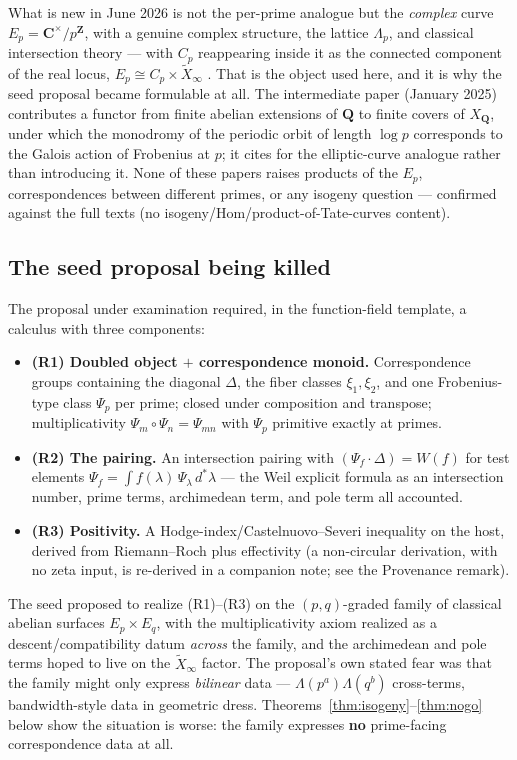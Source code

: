 \documentclass[11pt]{article}
\theoremstyle{definition}
\theoremstyle{remark}
\newcommand{\Z}{\mathbf{Z}}
\newcommand{\Q}{\mathbf{Q}}
\newcommand{\C}{\mathbf{C}}
\newcommand{\Hom}{\mathrm{Hom}}
\begin{document}
What is new in June 2026 is not the per-prime analogue but the \emph{complex}
curve $E_p = \C^\times/p^{\Z}$, with a genuine complex structure, the lattice
$\Lambda_p$, and classical intersection theory --- with $C_p$ reappearing inside
it as the connected component of the real locus, $E_p \cong C_p \times
\widetilde{X}_\infty$ \cite{CC26}. That is the object used here, and it is why
the seed proposal became formulable at all. The intermediate paper \cite{CC25}
(January 2025) contributes a functor from finite abelian extensions of $\Q$ to
finite covers of $X_\Q$, under which the monodromy of the periodic orbit of
length $\log p$ corresponds to the Galois action of Frobenius at $p$; it cites
\cite{CC17} for the elliptic-curve analogue rather than introducing it. None of
these papers raises products of the $E_p$, correspondences between different
primes, or any isogeny question --- confirmed against the full texts (no
isogeny/$\Hom$/product-of-Tate-curves content).

\subsection{The seed proposal being killed}
\label{sec:seed}

The proposal under examination required, in the function-field template, a
calculus with three components:

\begin{itemize}
\item \textbf{(R1) Doubled object $+$ correspondence monoid.} Correspondence
groups containing the diagonal $\Delta$, the fiber classes $\xi_1, \xi_2$,
and one Frobenius-type class $\Psi_p$ per prime; closed under composition and
transpose; multiplicativity $\Psi_m \circ \Psi_n = \Psi_{mn}$ with $\Psi_p$
primitive exactly at primes.
\item \textbf{(R2) The pairing.} An intersection pairing with
$(\Psi_f \cdot \Delta) = W(f)$ for test elements
$\Psi_f = \int f(\lambda)\, \Psi_\lambda \, d^*\lambda$ --- the Weil explicit
formula as an intersection number, prime terms, archimedean term, and pole
term all accounted.
\item \textbf{(R3) Positivity.} A Hodge-index/Castelnuovo--Severi inequality
on the host, derived from Riemann--Roch plus effectivity (a non-circular
derivation, with no zeta input, is re-derived in a companion note; see the
Provenance remark).
\end{itemize}

The seed proposed to realize (R1)--(R3) on the $(p,q)$-graded family of
classical abelian surfaces $E_p \times E_q$, with the multiplicativity axiom
realized as a descent/compatibility datum \emph{across} the family, and the
archimedean and pole terms hoped to live on the $\widetilde{X}_\infty$
factor. The proposal's own stated fear was that the family might only
express \emph{bilinear} data --- $\Lambda(p^a)\Lambda(q^b)$ cross-terms,
bandwidth-style data in geometric dress. Theorems~\ref{thm:isogeny}--\ref{thm:nogo}
below show the situation is worse: the family expresses \textbf{no}
prime-facing correspondence data at all.
\end{document}
